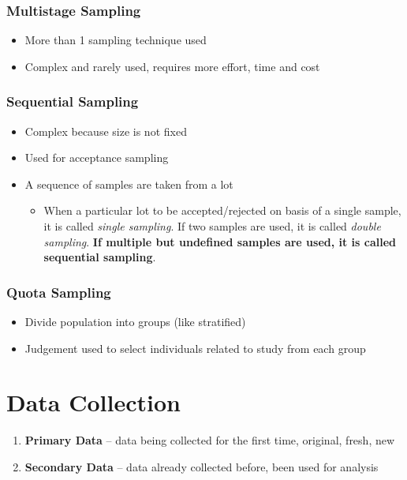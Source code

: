\documentclass{article}
\begin{document}
\subsubsection{Multistage Sampling}
\begin{itemize}
    \item More than 1 sampling technique used
    \item Complex and rarely used, requires more effort, time and cost
\end{itemize}

\subsubsection{Sequential Sampling}
\begin{itemize}
    \item Complex because size is not fixed
    \item Used for acceptance sampling
    \item A sequence of samples are taken from a lot
    \begin{itemize}
        \item When a particular lot to be accepted/rejected on basis of a single sample, it is called \textit{single sampling}. If two samples are used, it is called \textit{double sampling}. \textbf{If multiple but undefined samples are used, it is called sequential sampling}.
    \end{itemize}
\end{itemize}

\subsubsection{Quota Sampling}
\begin{itemize}
    \item Divide population into groups (like stratified)
    \item Judgement used to select individuals related to study from each group
\end{itemize}

\section{Data Collection}

\begin{enumerate}
    \item \textbf{Primary Data} -- data being collected for the first time, original, fresh, new
    \item \textbf{Secondary Data} -- data already collected before, been used for analysis
\end{enumerate}
\end{document}
